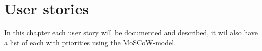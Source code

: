 


	
	\tableofcontents
	\chapter{User stories}
	In this chapter each user story will be documented and described, it wil also have a list of each with priorities using the MoSCoW-model.
	
	
	
	
	
